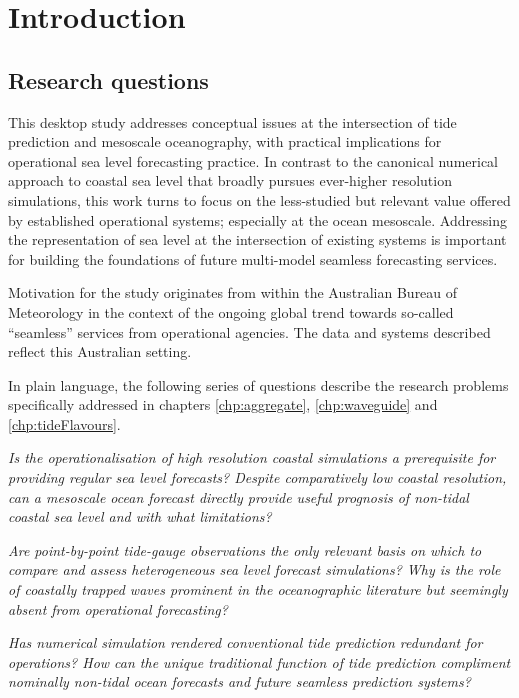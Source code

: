 \chapter{Introduction}
\label{chp:introduction}
\section{Research questions}
This desktop study addresses conceptual issues at the intersection of tide prediction and mesoscale oceanography, with practical implications for operational sea level forecasting practice. 
In contrast to the canonical numerical approach to coastal sea level that broadly pursues  ever-higher resolution simulations, this work turns to focus on the less-studied but relevant value offered by established operational systems; especially at the ocean mesoscale. Addressing the representation of sea level at the intersection of existing systems is important for building the foundations of future multi-model seamless forecasting services.


Motivation for the study originates from within the Australian Bureau of Meteorology in the context of the ongoing global trend towards so-called ``seamless'' services from operational agencies.   The data and systems described reflect this Australian setting.

In plain language, the following series of questions describe the research problems specifically addressed in chapters \ref{chp:aggregate}, \ref{chp:waveguide} and \ref{chp:tideFlavours}.

\emph{%
Is the operationalisation of high resolution coastal simulations a prerequisite for providing regular sea level forecasts?  Despite comparatively low coastal resolution, can a mesoscale ocean forecast directly provide useful prognosis of non-tidal coastal sea level and with what limitations? }



\emph{Are point-by-point tide-gauge observations the only relevant basis on which to compare and assess heterogeneous sea level forecast simulations? 
Why is the role of coastally trapped waves prominent in the oceanographic literature but seemingly absent from operational forecasting?}



\emph{Has numerical simulation rendered conventional tide prediction redundant for operations?  How can the unique traditional function of tide prediction compliment nominally non-tidal ocean forecasts and future seamless prediction systems? 
}


